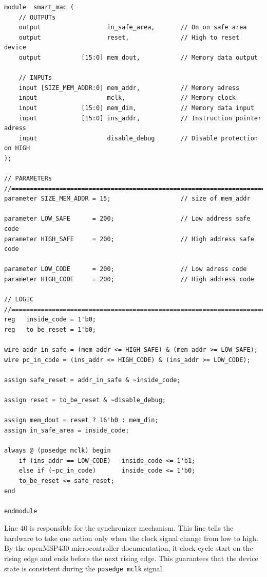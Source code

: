 \begin{lstlisting}[caption={Core code of the SMART MAC},label={code:core}]
module  smart_mac (
	// OUTPUTs
	output                  in_safe_area,       // On on safe area
	output                  reset,              // High to reset device
	output           [15:0] mem_dout,           // Memory data output
	
	// INPUTs
	input [SIZE_MEM_ADDR:0] mem_addr,           // Memory adress
	input                   mclk,               // Memory clock
	input            [15:0] mem_din,            // Memory data input
	input            [15:0] ins_addr,           // Instruction pointer adress
	input                   disable_debug       // Disable protection on HIGH
);

// PARAMETERs
//============================================================================
parameter SIZE_MEM_ADDR = 15;                   // size of mem_addr

parameter LOW_SAFE      = 200;                  // Low address safe code
parameter HIGH_SAFE     = 200;                  // High address safe code

parameter LOW_CODE      = 200;                  // Low adress code
parameter HIGH_CODE     = 200;                  // High address code

// LOGIC
//============================================================================
reg   inside_code = 1'b0;
reg   to_be_reset = 1'b0;

wire addr_in_safe = (mem_addr <= HIGH_SAFE) & (mem_addr >= LOW_SAFE);
wire pc_in_code = (ins_addr <= HIGH_CODE) & (ins_addr >= LOW_CODE);

assign safe_reset = addr_in_safe & ~inside_code;

assign reset = to_be_reset & ~disable_debug;

assign mem_dout = reset ? 16'b0 : mem_din;
assign in_safe_area = inside_code;

always @ (posedge mclk) begin
	if (ins_addr == LOW_CODE)   inside_code <= 1'b1;
	else if (~pc_in_code)       inside_code <= 1'b0;
	to_be_reset <= safe_reset;
end

endmodule
\end{lstlisting}

Line 40 is responsible for the synchronizer mechanism. This line tells the hardware to take one action only when the clock signal change from low to high. By the openMSP430 microcontroller documentation, it clock cycle start on the rising edge and ends before the next rising edge. This guarantees that the device state is consistent during the \verb|posedge mclk|  signal.

